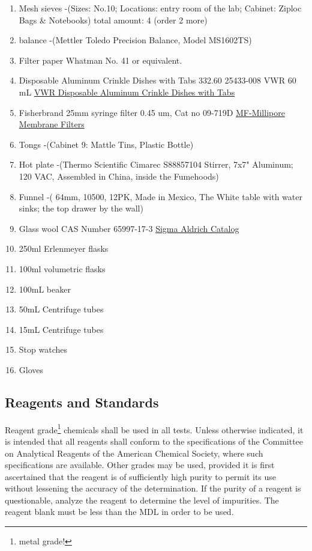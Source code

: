 \documentclass[12pt]{../SOP3_alpha}\usepackage[]{graphicx}\usepackage[]{color}
\begin{document}
\begin{enumerate}
  \item Mesh sieves -(Sizes: No.10; Locations: entry room of the lab; Cabinet: Ziploc Bags \& Notebooks) total amount: 4 (order 2 more) 
  \item balance -(Mettler Toledo Precision Balance, Model MS1602TS)
  \item Filter paper Whatman No. 41 or equivalent. 
  \item Disposable Aluminum Crinkle Dishes with Tabs 332.60 25433-008 VWR 60 mL          \href{https://us.vwr.com/store/catalog/product.jsp?product_id=4622693}{VWR Disposable Aluminum Crinkle Dishes with Tabs}
  \item Fisherbrand 25mm syringe filter 0.45 um, Cat no 09-719D \href{https://www.emdmillipore.com/US/en/product/MF-Millipore%E2%84%A2-Membrane-Filters,MM_NF-C152}{MF-Millipore Membrane Filters}
  \item Tongs -(Cabinet 9: Mattle Tins, Plastic Bottle)
  \item Hot plate -(Thermo Scientific Cimarec S88857104 Stirrer, 7x7" Aluminum; 120 VAC, Assembled in China, inside the Fumehoods)
  \item Funnel -( 64mm, 10500, 12PK, Made in Mexico, The White table with water sinks; the top drawer by the wall)
  \item Glass wool CAS Number 65997-17-3 \href{http://www.sigmaaldrich.com/catalog/product/sial/18421?lang=en&region=US}{Sigma Aldrich Catalog}
  \item 250ml Erlenmeyer flasks
  \item 100ml volumetric flasks
  \item 100mL beaker
  \item 50mL Centrifuge tubes
  \item 15mL Centrifuge tubes
  \item Stop watches 
  \item Gloves
\end{enumerate}

\subsection{Reagents and Standards}

\NP Reagent grade\footnote{metal grade!} chemicals shall be used in all tests. Unless otherwise indicated, it is
intended that all reagents shall conform to the specifications of the Committee on Analytical Reagents of the American Chemical Society, where such specifications are available. Other grades may be used, provided it is first ascertained that the reagent is of sufficiently high purity to permit its use without lessening the accuracy of the determination. If the purity of a reagent is questionable, analyze the reagent to determine the level of impurities. The reagent blank must be less than the MDL in order to be used. 
\end{document}

